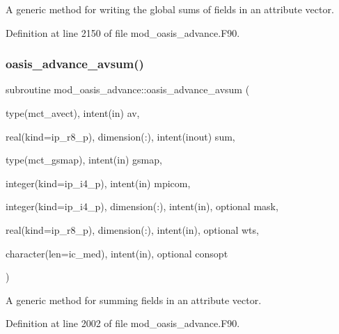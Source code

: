 A generic method for writing the global sums of fields in an attribute vector. 



Definition at line 2150 of file mod\+\_\+oasis\+\_\+advance.\+F90.

\mbox{\label{namespacemod__oasis__advance_acf8f4a02082ba2d9f32f0835ad14e11d}} 
\subsubsection{\texorpdfstring{oasis\+\_\+advance\+\_\+avsum()}{oasis\_advance\_avsum()}}
{\footnotesize\ttfamily subroutine mod\+\_\+oasis\+\_\+advance\+::oasis\+\_\+advance\+\_\+avsum (\begin{DoxyParamCaption}\item[{type(mct\+\_\+avect), intent(in)}]{av,  }\item[{real(kind=ip\+\_\+r8\+\_\+p), dimension(\+:), intent(inout)}]{sum,  }\item[{type(mct\+\_\+gsmap), intent(in)}]{gsmap,  }\item[{integer(kind=ip\+\_\+i4\+\_\+p), intent(in)}]{mpicom,  }\item[{integer(kind=ip\+\_\+i4\+\_\+p), dimension(\+:), intent(in), optional}]{mask,  }\item[{real(kind=ip\+\_\+r8\+\_\+p), dimension(\+:), intent(in), optional}]{wts,  }\item[{character(len=ic\+\_\+med), intent(in), optional}]{consopt }\end{DoxyParamCaption})\hspace{0.3cm}{\ttfamily [private]}}



A generic method for summing fields in an attribute vector. 



Definition at line 2002 of file mod\+\_\+oasis\+\_\+advance.\+F90.

\mbox{\label{namespacemod__oasis__advance_a480bfe5b333300c1084af8f9c239a81d}} 
